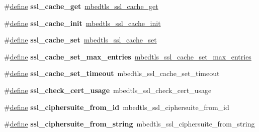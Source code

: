 \begin{DoxyCompactItemize}
\item 
\mbox{\label{compat-1_83_8h_a0aa050ebbbdaa062a4013616cb41d4d6}} 
\#\hyperlink{structdefine}{define} {\bfseries ssl\+\_\+cache\+\_\+get}~\hyperlink{ssl__cache_8h_af0ab0006ecbbec9405be5566ac16c4b3}{mbedtls\+\_\+ssl\+\_\+cache\+\_\+get}
\item 
\mbox{\label{compat-1_83_8h_a2a494a4736f79180575cedda0d37a188}} 
\#\hyperlink{structdefine}{define} {\bfseries ssl\+\_\+cache\+\_\+init}~\hyperlink{ssl__cache_8h_a90886fd9ad56471c5ebaed2e05086cd5}{mbedtls\+\_\+ssl\+\_\+cache\+\_\+init}
\item 
\mbox{\label{compat-1_83_8h_add8513a61f25f94277a0e5e2864ae9a8}} 
\#\hyperlink{structdefine}{define} {\bfseries ssl\+\_\+cache\+\_\+set}~\hyperlink{ssl__cache_8h_a896a81cf3107ba7464e6273970c2c1eb}{mbedtls\+\_\+ssl\+\_\+cache\+\_\+set}
\item 
\mbox{\label{compat-1_83_8h_a4e237fc67d1d836a5ea1612ab3b4bbdb}} 
\#\hyperlink{structdefine}{define} {\bfseries ssl\+\_\+cache\+\_\+set\+\_\+max\+\_\+entries}~\hyperlink{ssl__cache_8h_abc39c23cf3f791359104d9094bd9cf6f}{mbedtls\+\_\+ssl\+\_\+cache\+\_\+set\+\_\+max\+\_\+entries}
\item 
\mbox{\label{compat-1_83_8h_a5f27d1d1584f0786ca1bab4ab99c2ac1}} 
\#\hyperlink{structdefine}{define} {\bfseries ssl\+\_\+cache\+\_\+set\+\_\+timeout}~mbedtls\+\_\+ssl\+\_\+cache\+\_\+set\+\_\+timeout
\item 
\mbox{\label{compat-1_83_8h_a1c07da54d0e2c69f53d4409ac1a5ff20}} 
\#\hyperlink{structdefine}{define} {\bfseries ssl\+\_\+check\+\_\+cert\+\_\+usage}~mbedtls\+\_\+ssl\+\_\+check\+\_\+cert\+\_\+usage
\item 
\mbox{\label{compat-1_83_8h_acf1d72e617143a36bb194f323d5aa173}} 
\#\hyperlink{structdefine}{define} {\bfseries ssl\+\_\+ciphersuite\+\_\+from\+\_\+id}~mbedtls\+\_\+ssl\+\_\+ciphersuite\+\_\+from\+\_\+id
\item 
\mbox{\label{compat-1_83_8h_aa3514b1e9d02a3f674a25d0a38e9f274}} 
\#\hyperlink{structdefine}{define} {\bfseries ssl\+\_\+ciphersuite\+\_\+from\+\_\+string}~mbedtls\+\_\+ssl\+\_\+ciphersuite\+\_\+from\+\_\+string

\end{DoxyCompactItemize}
